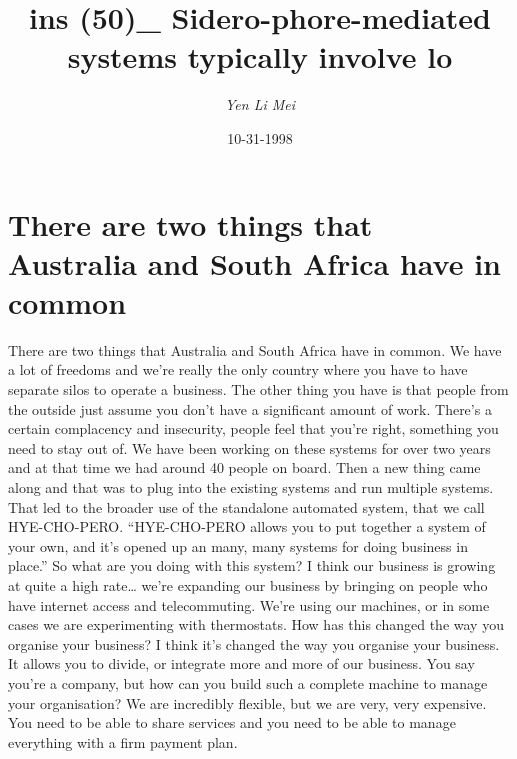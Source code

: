 \documentclass{article}%
\title{ins (50)\_ Sidero{-}phore{-}mediated systems typically involve lo}%
\author{\textit{Yen Li Mei}}%
\date{10-31-1998}%
\begin{document}
%
\normalsize%
\maketitle%
\section{There are two things that Australia and South Africa have in common}%
\label{sec:TherearetwothingsthatAustraliaandSouthAfricahaveincommon}%
There are two things that Australia and South Africa have in common. We have a lot of freedoms and we’re really the only country where you have to have separate silos to operate a business.\newline%
The other thing you have is that people from the outside just assume you don’t have a significant amount of work.\newline%
There’s a certain complacency and insecurity, people feel that you’re right, something you need to stay out of.\newline%
We have been working on these systems for over two years and at that time we had around 40 people on board.\newline%
Then a new thing came along and that was to plug into the existing systems and run multiple systems.\newline%
That led to the broader use of the standalone automated system, that we call HYE{-}CHO{-}PERO.\newline%
“HYE{-}CHO{-}PERO allows you to put together a system of your own, and it’s opened up an many, many systems for doing business in place.”\newline%
So what are you doing with this system?\newline%
I think our business is growing at quite a high rate… we’re expanding our business by bringing on people who have internet access and telecommuting.\newline%
We’re using our machines, or in some cases we are experimenting with thermostats.\newline%
How has this changed the way you organise your business?\newline%
I think it’s changed the way you organise your business. It allows you to divide, or integrate more and more of our business.\newline%
You say you’re a company, but how can you build such a complete machine to manage your organisation?\newline%
We are incredibly flexible, but we are very, very expensive. You need to be able to share services and you need to be able to manage everything with a firm payment plan.\newline%
\end{document}
